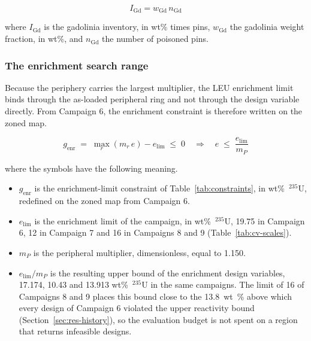 \begin{equation}
I_\mathrm{Gd} = w_\mathrm{Gd}\, n_\mathrm{Gd}
\label{eq:gd-inventory}
\end{equation}

\noindent where $I_\mathrm{Gd}$ is the gadolinia inventory, in wt\%
times pins, $w_\mathrm{Gd}$ the gadolinia weight fraction, in wt\%, and
$n_\mathrm{Gd}$ the number of poisoned pins.

\subsubsection{The enrichment search range}
\label{sec:meth-zoning-box}

Because the periphery carries the largest multiplier, the LEU
enrichment limit binds through the as-loaded peripheral ring
and not through the design variable directly. From Campaign 6, the
enrichment constraint is therefore written on the zoned map.

\begin{equation}
g_\mathrm{enr} \;=\; \max_r \left( m_r\, e \right) - e_\mathrm{lim} \;\le\; 0
\quad\Longrightarrow\quad
e \;\le\; \frac{e_\mathrm{lim}}{m_P}
\label{eq:leu-box}
\end{equation}

\noindent where the symbols have the following meaning.

\begin{itemize}
  \item $g_\mathrm{enr}$ is the enrichment-limit constraint of
        Table~\ref{tab:constraints}, in wt\%~$^{235}$U, redefined on
        the zoned map from Campaign 6.

  \item $e_\mathrm{lim}$ is the enrichment limit of the campaign, in
        wt\%~$^{235}$U, 19.75 in Campaign 6, 12 in Campaign 7 and 16 in
        Campaigns 8 and 9 (Table~\ref{tab:cv-scales}).

  \item $m_P$ is the peripheral multiplier, dimensionless, equal to
        1.150.

  \item $e_\mathrm{lim}/m_P$ is the resulting upper bound of the
        enrichment design variables, 17.174, 10.43 and 13.913
        wt\%~$^{235}$U in the same campaigns. The limit of 16 of
        Campaigns 8 and 9 places this bound close to the \SI{13.8}{wt\%}
        above which every design of Campaign 6 violated the upper
        reactivity bound (Section~\ref{sec:res-history}), so the
        evaluation budget is not spent on a region that returns
        infeasible designs.
\end{itemize}


